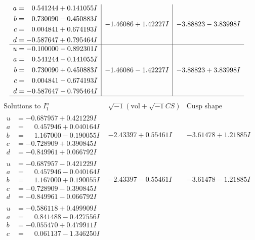 \documentclass[1p]{elsarticle_modified}
\theoremstyle{definition}
\newcommand{\I}{\sqrt{-1}}
\begin{document}
$$\begin{array}{c|c|c}
\begin{aligned}
a &= \phantom{-}0.541244 + 0.141055 I \\
b &= \phantom{-}0.730090 - 0.450883 I \\
c &= \phantom{-}0.004841 + 0.674193 I \\
d &= -0.587647 + 0.795464 I\end{aligned}
 & -1.46086 + 1.42227 I & -3.88823 - 3.83998 I \\ \hline\begin{aligned}
u &= -0.100000 - 0.892301 I \\
a &= \phantom{-}0.541244 - 0.141055 I \\
b &= \phantom{-}0.730090 + 0.450883 I \\
c &= \phantom{-}0.004841 - 0.674193 I \\
d &= -0.587647 - 0.795464 I\end{aligned}
 & -1.46086 - 1.42227 I & -3.88823 + 3.83998 I\\
 \hline 
 \end{array}$$\newpage$$\begin{array}{c|c|c}  
\text{Solutions to }I^u_{1}& \I (\text{vol} + \sqrt{-1}CS) & \text{Cusp shape}\\
 \hline 
\begin{aligned}
u &= -0.687957 + 0.421229 I \\
a &= \phantom{-}0.457946 + 0.040164 I \\
b &= \phantom{-}1.167000 - 0.190055 I \\
c &= -0.728909 + 0.390845 I \\
d &= -0.849961 + 0.066792 I\end{aligned}
 & -2.43397 + 0.55461 I & -3.61478 + 1.21885 I \\ \hline\begin{aligned}
u &= -0.687957 - 0.421229 I \\
a &= \phantom{-}0.457946 - 0.040164 I \\
b &= \phantom{-}1.167000 + 0.190055 I \\
c &= -0.728909 - 0.390845 I \\
d &= -0.849961 - 0.066792 I\end{aligned}
 & -2.43397 - 0.55461 I & -3.61478 - 1.21885 I \\ \hline\begin{aligned}
u &= -0.586118 + 0.499909 I \\
a &= \phantom{-}0.841488 - 0.427556 I \\
b &= -0.055470 + 0.479911 I \\
c &= \phantom{-}0.061137 - 1.346250 I \\

\end{aligned}
\end{array}$$
\end{document}
